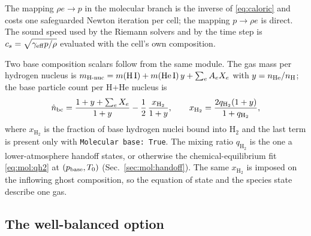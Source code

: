 The mapping $\rho e \to p$ in the molecular branch is the inverse of
\eqref{eq:caloric} and costs one safeguarded Newton iteration per cell; the
mapping $p \to \rho e$ is direct.  The sound speed used by the Riemann
solvers and by the time step is $c_s = \sqrt{\gamma_{\rm eff}p/\rho}$
evaluated with the cell's own composition.

Two base composition scalars follow from the same module.  The gas mass per
hydrogen nucleus is
$m_{\rm H\text{-}nuc} = m(\mathrm{H\,I}) + m(\mathrm{He\,I})\,y + \sum_e A_e X_e$
with $y = n_{\rm He}/n_{\rm H}$; the base particle count per H+He nucleus is
%
\begin{equation}
  \hat n_{\rm bc} = \frac{1 + y + \sum_e X_e}{1 + y}
                    - \frac{1}{2}\,\frac{x_{\mathrm{H_2}}}{1+y},
  \qquad
  x_{\mathrm{H_2}} = \frac{2 q_{\mathrm{H_2}}(1+y)}{1 + q_{\mathrm{H_2}}},
  \label{eq:ntotbc}
\end{equation}
%
where $x_{\mathrm{H_2}}$ is the fraction of base hydrogen nuclei bound into
$\mathrm{H}_2$
and the last term is present only with \texttt{Molecular base: True}.  The
mixing ratio $q_{\mathrm{H_2}}$ is the one a lower-atmosphere handoff states,
or otherwise the chemical-equilibrium fit \eqref{eq:mol:qh2} at
$(p_{\rm base}, T_0)$ (Sec.~\ref{sec:mol:handoff}).  The same
$x_{\mathrm{H_2}}$ is imposed on the inflowing ghost composition, so the equation of state
and the species state describe one gas.

\subsection{The well-balanced option}
\label{sec:hydro:wb}

